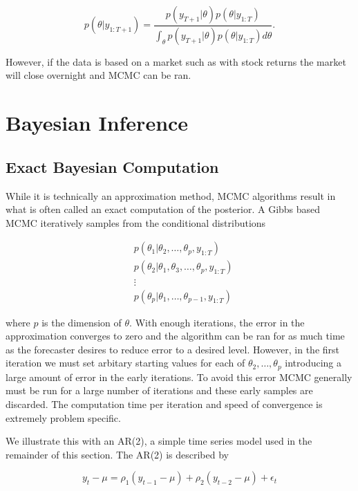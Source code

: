 \documentclass{article}\usepackage[]{graphicx}\usepackage[]{color}
\numberwithin{equation}{section}
\begin{document}
\begin{equation}
\label{posteriorupdate}
p(\theta | y_{1:T+1}) = \frac{p(y_{T+1} | \theta) p(\theta | y_{1:T})}{\int_\theta p(y_{T+1} | \theta) p(\theta | y_{1:T}) d\theta}.
\end{equation}

However, if the data is based on a market such as with stock returns the market will close overnight and MCMC can be ran.

\section{Bayesian Inference}
\subsection{Exact Bayesian Computation}
While it is technically an approximation method, MCMC algorithms result in what is often called an exact computation of the posterior. A Gibbs based MCMC iteratively samples from the conditional distributions

\begin{align}
&p(\theta_1 | \theta_2, \dots, \theta_p, y_{1:T}) \nonumber \\
&p(\theta_2 | \theta_1, \theta_3, \dots, \theta_p, y_{1:T}) \nonumber \\
&\vdots \nonumber \\
&p(\theta_p | \theta_1, \dots, \theta_{p-1}, y_{1:T}) \nonumber
\end{align}

where $p$ is the dimension of $\theta$. With enough iterations, the error in the approximation converges to zero and the algorithm can be ran for as much time as the forecaster desires to reduce error to a desired level. However, in the first iteration we must set arbitary starting values for each of $\theta_2, \dots, \theta_p$ introducing a large amount of error in the early iterations. To avoid this error MCMC generally must be run for a large number of iterations and these early samples are discarded. The computation time per iteration and speed of convergence is extremely problem specific. 

We illustrate this with an AR(2), a simple time series model used in the remainder of this section. The AR(2) is described by

\begin{equation}
\label{AR2}
y_t - \mu = \rho_1 (y_{t-1} - \mu) + \rho_2 (y_{t-2} - \mu) + \epsilon_t
\end{equation}
\end{document}
